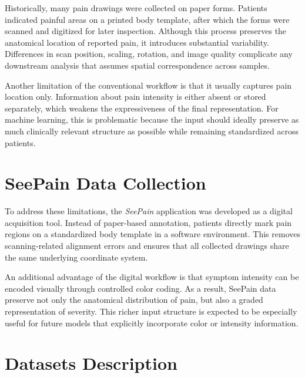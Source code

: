 \documentclass[12pt]{report}
\begin{document}
Historically, many pain drawings were collected on paper forms. Patients indicated painful areas on a printed body template, after which the forms were scanned and digitized for later inspection. Although this process preserves the anatomical location of reported pain, it introduces substantial variability. Differences in scan position, scaling, rotation, and image quality complicate any downstream analysis that assumes spatial correspondence across samples.

Another limitation of the conventional workflow is that it usually captures pain location only. Information about pain intensity is either absent or stored separately, which weakens the expressiveness of the final representation. For machine learning, this is problematic because the input should ideally preserve as much clinically relevant structure as possible while remaining standardized across patients.

\section{SeePain Data Collection}

To address these limitations, the \textit{SeePain} application was developed as a digital acquisition tool. Instead of paper-based annotation, patients directly mark pain regions on a standardized body template in a software environment. This removes scanning-related alignment errors and ensures that all collected drawings share the same underlying coordinate system.

An additional advantage of the digital workflow is that symptom intensity can be encoded visually through controlled color coding. As a result, SeePain data preserve not only the anatomical distribution of pain, but also a graded representation of severity. This richer input structure is expected to be especially useful for future models that explicitly incorporate color or intensity information.

\section{Datasets Description}
\end{document}

